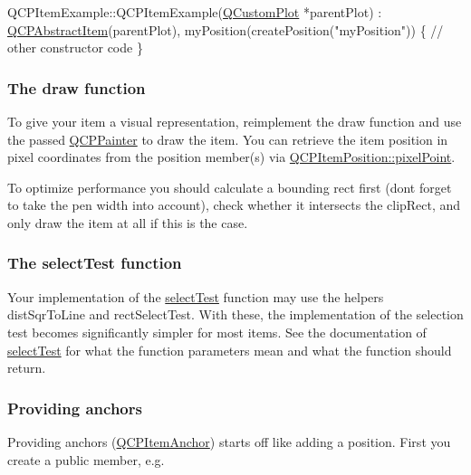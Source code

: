 \begin{DoxyCode}
QCPItemExample::QCPItemExample(\mbox{\hyperlink{class_q_custom_plot}{QCustomPlot}} *parentPlot) :
  \mbox{\hyperlink{class_q_c_p_abstract_item}{QCPAbstractItem}}(parentPlot),
  myPosition(createPosition(\textcolor{stringliteral}{"myPosition"}))
\{
  \textcolor{comment}{// other constructor code}
\}
\end{DoxyCode}
\hypertarget{class_q_c_p_abstract_item_items-drawing}{}\subsubsection{The draw function}\label{class_q_c_p_abstract_item_items-drawing}
To give your item a visual representation, reimplement the draw function and use the passed \mbox{\hyperlink{class_q_c_p_painter}{Q\+C\+P\+Painter}} to draw the item. You can retrieve the item position in pixel coordinates from the position member(s) via \mbox{\hyperlink{class_q_c_p_item_position_a6cad070c22801295231f5bd6045afe70}{Q\+C\+P\+Item\+Position\+::pixel\+Point}}.

To optimize performance you should calculate a bounding rect first (don\textquotesingle{}t forget to take the pen width into account), check whether it intersects the clip\+Rect, and only draw the item at all if this is the case.\hypertarget{class_q_c_p_abstract_item_items-selection}{}\subsubsection{The select\+Test function}\label{class_q_c_p_abstract_item_items-selection}
Your implementation of the \mbox{\hyperlink{class_q_c_p_abstract_item_a96d522d10ffc0413b9a366c6f7f0476b}{select\+Test}} function may use the helpers dist\+Sqr\+To\+Line and rect\+Select\+Test. With these, the implementation of the selection test becomes significantly simpler for most items. See the documentation of \mbox{\hyperlink{class_q_c_p_abstract_item_a96d522d10ffc0413b9a366c6f7f0476b}{select\+Test}} for what the function parameters mean and what the function should return.\hypertarget{class_q_c_p_abstract_item_anchors}{}\subsubsection{Providing anchors}\label{class_q_c_p_abstract_item_anchors}
Providing anchors (\mbox{\hyperlink{class_q_c_p_item_anchor}{Q\+C\+P\+Item\+Anchor}}) starts off like adding a position. First you create a public member, e.\+g.


